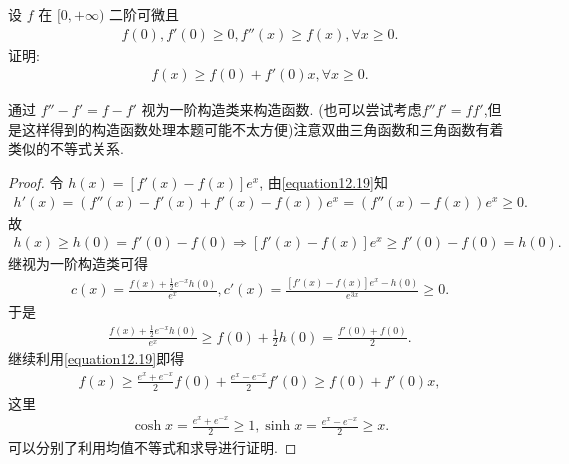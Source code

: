 \documentclass[../../main.tex]{subfiles}%
\begin{document}
\begin{example}
设 $f$ 在 $[0,+\infty)$ 二阶可微且
\begin{align}
f(0),f'(0)\geqslant0,f''(x)\geqslant f(x),\forall x\geqslant0.
\label{equation12.19}
\end{align}
证明:
\begin{align}
f(x)\geqslant f(0)+f'(0)x,\forall x\geqslant0.
\label{equation12.20}
\end{align}
\end{example}
\begin{note}
通过 $f'' - f' = f - f'$ 视为一阶构造类来构造函数. (也可以尝试考虑$f''f'=ff'$,但是这样得到的构造函数处理本题可能不太方便)注意双曲三角函数和三角函数有着类似的不等式关系.
\end{note}
\begin{proof}
令 $h(x)=[f'(x)-f(x)]e^x$, 由\eqref{equation12.19}知
\begin{align*}
h' \left( x \right) =\left( f'' \left( x \right) -f' \left( x \right) +f' \left( x \right) -f\left( x \right) \right) e^x=\left( f'' \left( x \right) -f\left( x \right) \right) e^x \geqslant 0.
\end{align*}
故
\begin{align*}
h(x)\geqslant  h(0)=f'(0)-f(0)\Rightarrow [f'(x)-f(x)]e^x\geqslant  f'(0)-f(0)=h(0).
\end{align*}
继视为一阶构造类可得
\begin{align*}
c(x)=\frac{f(x)+\frac{1}{2}e^{-x}h(0)}{e^{x}},c'(x)=\frac{[f'(x)-f(x)]e^x-h(0)}{e^{3x}}\geqslant0.
\end{align*}
于是
\begin{align*}
\frac{f(x)+\frac{1}{2}e^{-x}h(0)}{e^{x}}\geqslant f(0)+\frac{1}{2}h(0)=\frac{f'(0)+f(0)}{2}.
\end{align*}
继续利用\eqref{equation12.19}即得
\begin{align*}
f(x)\geqslant\frac{e^{x}+e^{-x}}{2}f(0)+\frac{e^{x}-e^{-x}}{2}f'(0)\geqslant f(0)+f'(0)x,
\end{align*}
这里
\begin{align*}
\cosh x=\frac{e^{x}+e^{-x}}{2}\geqslant1,\sinh x=\frac{e^{x}-e^{-x}}{2}\geqslant x.
\end{align*}
可以分别了利用均值不等式和求导进行证明. 
\end{proof}
\end{document}
